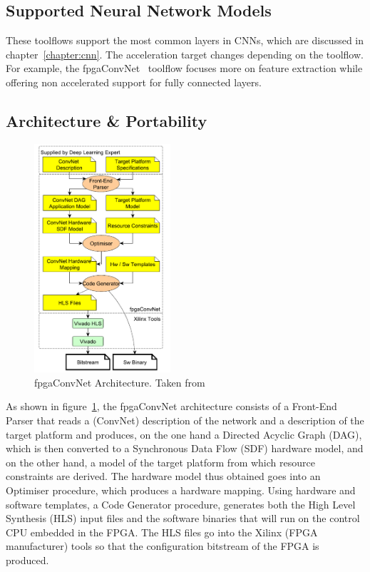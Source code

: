 \subsection{Supported Neural Network Models}

These toolflows support the most common layers in CNNs, which are discussed in
chapter~\ref{chapter:cnn}. The acceleration target changes depending on the
toolflow.  For example, the fpgaConvNet~\cite{fpgaconvnet} toolflow focuses more
on feature extraction while offering non accelerated support for fully connected
layers.

\subsection{Architecture \& Portability}

\begin{figure}[!htbp]
    \centering
    \includegraphics[width=0.45\textwidth]{Figures/fpgaconvnet.png}
    \caption{fpgaConvNet Architecture. Taken from~\cite{fpgaconvnet}}
    \label{figure:fpgaconvnet}
\end{figure}

As shown in figure~\ref{figure:fpgaconvnet}, the fpgaConvNet architecture
consists of a Front-End Parser that reads a (ConvNet) description of the network
and a description of the target platform and produces, on the one hand a
Directed Acyclic Graph (DAG), which is then converted to a Synchronous Data Flow
(SDF) hardware model, and on the other hand, a model of the target platform from
which resource constraints are derived. The hardware model thus obtained goes
into an Optimiser procedure, which produces a hardware mapping. Using hardware
and software templates, a Code Generator procedure, generates both the High
Level Synthesis (HLS) input files and the software binaries that will run on the
control CPU embedded in the FPGA. The HLS files go into the Xilinx (FPGA
manufacturer) tools so that the configuration bitstream of the FPGA is produced.

